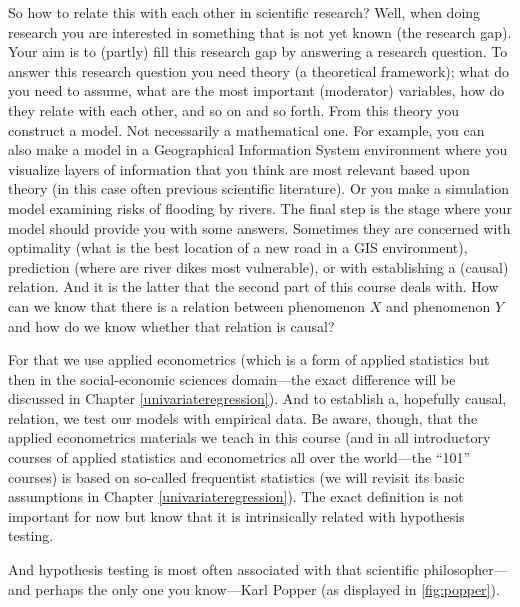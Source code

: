 \documentclass[
]{book}
\begin{document}
So how to relate this with each other in scientific research? Well, when doing research you are interested in something that is not yet known (the research gap). Your aim is to (partly) fill this research gap by answering a research question. To answer this research question you need theory (a theoretical framework); what do you need to assume, what are the most important (moderator) variables, how do they relate with each other, and so on and so forth. From this theory you construct a model. Not necessarily a mathematical one. For example, you can also make a model in a Geographical Information System environment where you visualize layers of information that you think are most relevant based upon theory (in this case often previous scientific literature). Or you make a simulation model examining risks of flooding by rivers. The final step is the stage where your model should provide you with some answers. Sometimes they are concerned with optimality (what is the best location of a new road in a GIS environment), prediction (where are river dikes most vulnerable), or with establishing a (causal) relation. And it is the latter that the second part of this course deals with. How can we know that there is a relation between phenomenon \(X\) and phenomenon \(Y\) and how do we know whether that relation is causal?

For that we use applied econometrics (which is a form of applied statistics but then in the social-economic sciences domain---the exact difference will be discussed in Chapter \ref{univariateregression}). And to establish a, hopefully causal, relation, we test our models with empirical data. Be aware, though, that the applied econometrics materials we teach in this course (and in all introductory courses of applied statistics and econometrics all over the world---the ``101'' courses) is based on so-called frequentist statistics (we will revisit its basic assumptions in Chapter \ref{univariateregression}). The exact definition is not important for now but know that it is intrinsically related with hypothesis testing.

And hypothesis testing is most often associated with that scientific philosopher---and perhaps the only one you know---Karl Popper (as displayed in \ref{fig:popper}).
\end{document}
